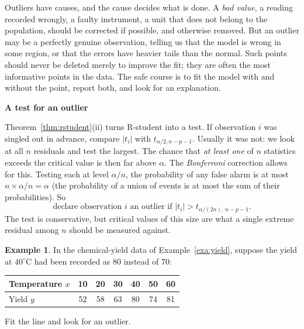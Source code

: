 \documentclass[11pt,a4paper]{article}
\numberwithin{equation}{section}
\theoremstyle{definition}
\newtheorem{exa}[thm]{Example}
\newcommand{\subhead}[1]{%
  \par\medskip\noindent\textbf{#1}\par\nobreak\smallskip}
\begin{document}
Outliers have causes, and the cause decides what is done. A \emph{bad value}, a reading
recorded wrongly, a faulty instrument, a unit that does not belong to the population, should
be corrected if possible, and otherwise removed. But an outlier may be a perfectly genuine
observation, telling us that the model is wrong in some region, or that the errors have
heavier tails than the normal. Such points should never be deleted merely to improve the
fit; they are often the most informative points in the data. The safe course is to fit the
model with and without the point, report both, and look for an explanation.

\subhead{A test for an outlier}
Theorem~\ref{thm:rstudent}(ii) turns R-student into a test. If observation $i$ was singled
out in advance, compare $|t_i|$ with $t_{\alpha/2, n - p - 1}$. Usually it was not: we look
at all $n$ residuals and test the largest. The chance that \emph{at least one} of $n$
statistics exceeds the critical value is then far above $\alpha$. The \emph{Bonferroni}
correction allows for this. Testing each at level $\alpha/n$, the probability of any false
alarm is at most $n \times \alpha/n = \alpha$ (the probability of a union of events is at
most the sum of their probabilities). So
\[
\text{declare observation } i \text{ an outlier if } |t_i| > t_{\alpha/(2n),\, n - p - 1} .
\]
The test is conservative, but critical values of this size are what a single extreme
residual among $n$ should be measured against.

\begin{exa}\label{exa:yield-outlier}
In the chemical-yield data of Example~\ref{exa:yield}, suppose the yield at $40^\circ$C had
been recorded as $80$ instead of $70$:
\begin{center}
\begin{tabular}{l|cccccc}
Temperature $x$ & 10 & 20 & 30 & 40 & 50 & 60 \\
\hline
Yield $y$ & 52 & 58 & 63 & 80 & 74 & 81 \\
\end{tabular}
\end{center}
Fit the line and look for an outlier.
\end{exa}
\end{document}

